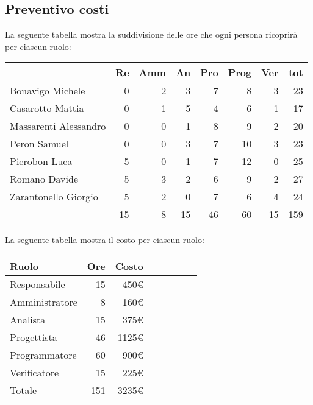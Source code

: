 \subsection{Preventivo costi}

La seguente tabella mostra la suddivisione delle ore che ogni persona ricoprirà per ciascun ruolo:

\begin{table}[H]
    \begin{tabularx}{\linewidth}{X|rrrrrrr}
    \rowcolor{gray!30}& Re & Amm & An & Pro & Prog & Ver & tot \\
    \hline
    Bonavigo Michele                        & 0 & 2 & 3 & 7 & 8 & 3 & 23 \\
    \rowcolor{gray!10}Casarotto Mattia      & 0 & 1 & 5 & 4 & 6 & 1 & 17 \\
    Massarenti Alessandro                   & 0 & 0 & 1 & 8 & 9 & 2 & 20 \\
    \rowcolor{gray!10}Peron Samuel          & 0 & 0 & 3 & 7 & 10 & 3 & 23 \\
    Pierobon Luca                           & 5 & 0 & 1 & 7 & 12 & 0 & 25 \\
    \rowcolor{gray!10}Romano Davide         & 5 & 3 & 2 & 6 & 9 & 2 & 27 \\
    Zarantonello Giorgio                    & 5 & 2 & 0 & 7 & 6 & 4 & 24 \\
    \hline                                  & 15 & 8 & 15 & 46 & 60 & 15 & 159 \\ 
    \end{tabularx}
\end{table}

La seguente tabella mostra il costo per ciascun ruolo:
\begin{table}[H]
    \begin{tabularx}{\linewidth}{X|rrrrrrr}
    \rowcolor{gray!30}Ruolo & Ore & Costo \\
    \hline
    Responsabile                            & 15  & 450€ \\
    \rowcolor{gray!10}Amministratore        & 8 & 160€ \\
    Analista                                & 15  & 375€ \\
    \rowcolor{gray!10}Progettista           & 46  & 1125€ \\
    Programmatore                           & 60 & 900€ \\
    \rowcolor{gray!10}Verificatore          & 15  & 225€ \\
    \hline Totale                           & 151  & 3235€ \\ 
    \end{tabularx}
\end{table}

